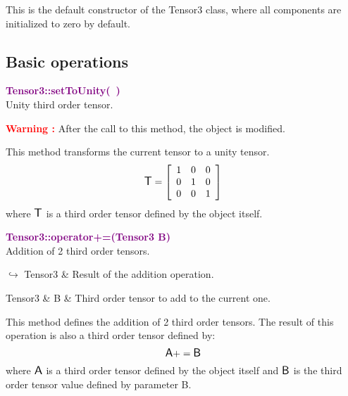This is the default constructor of the Tensor3 class, where all components are initialized to zero by default.

\subsection{Basic operations}

\textcolor{purple}{\textbf{Tensor3::setToUnity(~)}}\label{Tensor3::setToUnity()}\\
Unity third order tensor.

\hspace*{10mm}\textcolor{red}{\textbf{Warning :}} After the call to this method, the object is modified.

This method transforms the current tensor to a unity tensor.
\begin{equation*}
\mbox{\large\ensuremath{\mathsf{T}}}=\left[\begin{array}{ccc}
1&0&0\\
0&1&0\\
0&0&1
\end{array}\right]
\end{equation*}
where $\mbox{\large\ensuremath{\mathsf{T}}}$ is a third order tensor defined by the object itself.

\textcolor{purple}{\textbf{Tensor3::operator+=(Tensor3 B)}}\label{Tensor3::operator+=(Tensor3 B)}\\
Addition of 2 third order tensors.\vspace*{-0.5em}
\begin{tcolorbox}[grow to left by=-1cm, width=\textwidth-1cm,myArgs,tabularx={l|R}]
$\hookrightarrow$ Tensor3 & Result of the addition operation.
\end{tcolorbox}

\begin{tcolorbox}[width=\textwidth,myArgs,tabularx={ll|R}]
Tensor3 & B & Third order tensor to add to the current one.
\end{tcolorbox}

This method defines the addition of 2 third order tensors.
The result of this operation is also a third order tensor defined by:
\begin{equation*}
\mbox{\large\ensuremath{\mathsf{A}}} += \mbox{\large\ensuremath{\mathsf{B}}}
\end{equation*}
where $\mbox{\large\ensuremath{\mathsf{A}}}$ is a third order tensor defined by the object itself and $\mbox{\large\ensuremath{\mathsf{B}}}$ is the third order tensor value defined by parameter B.

